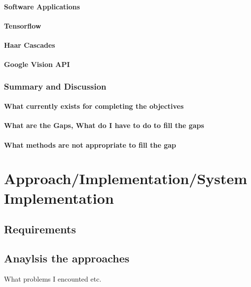 \documentclass{mproj}
\begin{document}
\subsubsection{Software Applications}
\subsubsection{Tensorflow}
\subsubsection{Haar Cascades}
\subsubsection{Google Vision API}

\subsection{Summary and Discussion}
\subsubsection{What currently exists for completing the objectives}
\subsubsection{What are the Gaps, What do I have to do to fill the gaps}
\subsubsection{What methods are not appropriate to fill the gap}




\chapter{Approach/Implementation/System Implementation}

\section{Requirements}


\section{Anaylsis the approaches}

What problems I encounted etc.
\end{document}
